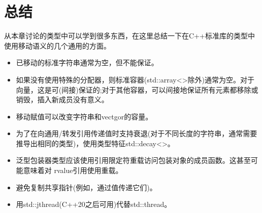 \section{总结}
从本章讨论的类型中可以学到很多东西，在这里总结一下在C++标准库的类型中使用移动语义的几个通用的方面。

\begin{itemize}
	\item 已移动的标准字符串通常为空，但不能保证。
	\item 如果没有使用特殊的分配器，则标准容器(std::array<>除外)通常为空。对于向量，这是可(间接)保证的;对于其他容器，可以间接地保证所有元素都移除或销毁，插入新成员没有意义。
	\item 移动赋值可以改变字符串和vectgor的容量。
	\item 为了在向通用/转发引用传递值时支持衰退(对于不同长度的字符串，通常需要推导出相同的类型)，使用类型特征std::decay<>。
	\item 泛型包装器类型应该使用引用限定符重载访问包装对象的成员函数。这甚至可能意味着对 rvalue引用使用重载。
	\item 避免复制共享指针(例如，通过值传递它们)。
	\item 用std::jthread(C++20之后可用)代替std::thread。
\end{itemize}


